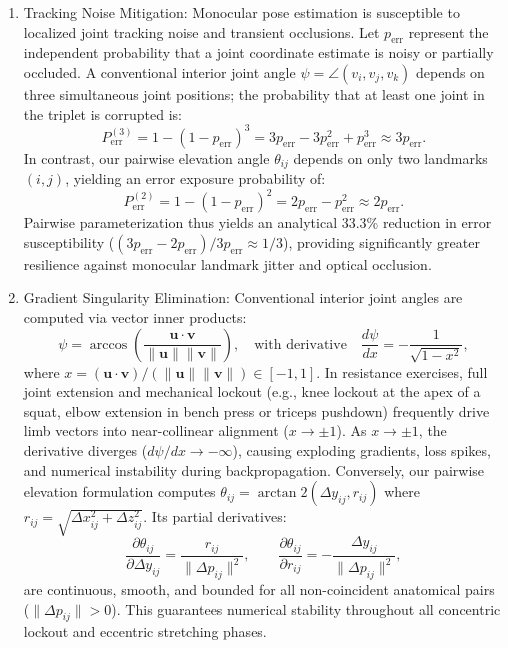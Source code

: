 \documentclass[preprint,12pt]{elsarticle}
\begin{document}
\begin{enumerate}
    \item Tracking Noise Mitigation: Monocular pose estimation is susceptible to localized joint tracking noise and transient occlusions. Let $p_{\text{err}}$ represent the independent probability that a joint coordinate estimate is noisy or partially occluded. A conventional interior joint angle $\psi = \angle(v_i, v_j, v_k)$ depends on three simultaneous joint positions; the probability that at least one joint in the triplet is corrupted is:
    \begin{equation}
        P_{\text{err}}^{(3)} = 1 - (1 - p_{\text{err}})^3 = 3p_{\text{err}} - 3p_{\text{err}}^2 + p_{\text{err}}^3 \approx 3p_{\text{err}}.
    \end{equation}
    In contrast, our pairwise elevation angle $\theta_{ij}$ depends on only two landmarks $(i, j)$, yielding an error exposure probability of:
    \begin{equation}
        P_{\text{err}}^{(2)} = 1 - (1 - p_{\text{err}})^2 = 2p_{\text{err}} - p_{\text{err}}^2 \approx 2p_{\text{err}}.
    \end{equation}
    Pairwise parameterization thus yields an analytical 33.3\% reduction in error susceptibility ($(3p_{\text{err}} - 2p_{\text{err}})/3p_{\text{err}} \approx 1/3$), providing significantly greater resilience against monocular landmark jitter and optical occlusion.

    \item Gradient Singularity Elimination: Conventional interior joint angles are computed via vector inner products:
    \begin{equation}
        \psi = \arccos\left( \frac{\mathbf{u} \cdot \mathbf{v}}{\|\mathbf{u}\| \|\mathbf{v}\|} \right), \quad \text{with derivative} \quad \frac{d\psi}{dx} = -\frac{1}{\sqrt{1 - x^2}},
    \end{equation}
    where $x = (\mathbf{u} \cdot \mathbf{v}) / (\|\mathbf{u}\| \|\mathbf{v}\|) \in [-1, 1]$. In resistance exercises, full joint extension and mechanical lockout (e.g., knee lockout at the apex of a squat, elbow extension in bench press or triceps pushdown) frequently drive limb vectors into near-collinear alignment ($x \to \pm 1$). As $x \to \pm 1$, the derivative diverges ($d\psi/dx \to -\infty$), causing exploding gradients, loss spikes, and numerical instability during backpropagation. Conversely, our pairwise elevation formulation computes $\theta_{ij} = \arctan2(\Delta y_{ij}, r_{ij})$ where $r_{ij} = \sqrt{\Delta x_{ij}^2 + \Delta z_{ij}^2}$. Its partial derivatives:
    \begin{equation}
        \frac{\partial \theta_{ij}}{\partial \Delta y_{ij}} = \frac{r_{ij}}{\|\Delta p_{ij}\|^2}, \qquad \frac{\partial \theta_{ij}}{\partial r_{ij}} = -\frac{\Delta y_{ij}}{\|\Delta p_{ij}\|^2},
    \end{equation}
    are continuous, smooth, and bounded for all non-coincident anatomical pairs ($\|\Delta p_{ij}\| > 0$). This guarantees numerical stability throughout all concentric lockout and eccentric stretching phases.


\end{enumerate}
\end{document}
